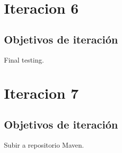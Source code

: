 \documentclass[12pt,a4paper]{report}
\begin{document}
\chapter{Iteracion 6}
\section{Objetivos de iteración}
Final testing.

\chapter{Iteracion 7}
\section{Objetivos de iteración}
Subir a repositorio Maven.
\end{document}

